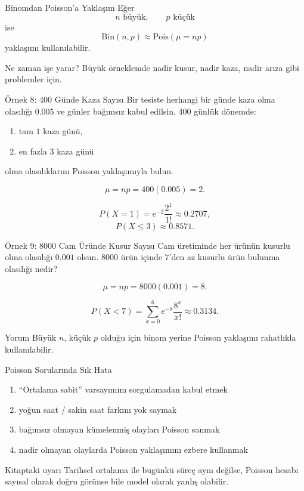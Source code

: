 \documentclass[light]{lutbeamer}
\begin{document}
\begin{frame}{Binomdan Poisson'a Yaklaşım}
    \small
    Eğer
    \[
    n \text{ büyük}, \qquad p \text{ küçük}
    \]
    ise
    \[
    \mathrm{Bin}(n,p)\approx \mathrm{Pois}(\mu=np)
    \]
    yaklaşımı kullanılabilir.

    \begin{block}{Ne zaman işe yarar?}
        Büyük örneklemde nadir kusur, nadir kaza, nadir arıza gibi problemler için.
    \end{block}
\end{frame}

\begin{frame}{Örnek 8: 400 Günde Kaza Sayısı}
    \small
    Bir tesiste herhangi bir günde kaza olma olasılığı \(0.005\) ve günler bağımsız kabul edilsin. \(400\) günlük dönemde:
    \begin{enumerate}
        \item[(a)] tam \(1\) kaza günü,
        \item[(b)] en fazla \(3\) kaza günü
    \end{enumerate}
    olma olasılıklarını Poisson yaklaşımıyla bulun.

    \[
    \mu=np=400(0.005)=2.
    \]

    \[
    P(X=1)=e^{-2}\frac{2^1}{1!}\approx 0.2707,
    \]
    \[
    P(X\le 3)\approx 0.8571.
    \]
\end{frame}

\begin{frame}{Örnek 9: 8000 Cam Üründe Kusur Sayısı}
    \small
    Cam üretiminde her ürünün kusurlu olma olasılığı \(0.001\) olsun. \(8000\) ürün içinde \(7\)'den az kusurlu ürün bulunma olasılığı nedir?

    \[
    \mu=np=8000(0.001)=8.
    \]

    \[
    P(X<7)=\sum_{x=0}^{6} e^{-8}\frac{8^x}{x!}\approx 0.3134.
    \]

    \begin{exampleblock}{Yorum}
        Büyük \(n\), küçük \(p\) olduğu için binom yerine Poisson yaklaşımı rahatlıkla kullanılabilir.
    \end{exampleblock}
\end{frame}

\begin{frame}{Poisson Sorularında Sık Hata}
    \small
    \begin{enumerate}
        \item ``Ortalama sabit'' varsayımını sorgulamadan kabul etmek
        \item yoğun saat / sakin saat farkını yok saymak
        \item bağımsız olmayan kümelenmiş olayları Poisson sanmak
        \item nadir olmayan olaylarda Poisson yaklaşımını ezbere kullanmak
    \end{enumerate}

    \begin{alertblock}{Kitaptaki uyarı}
        Tarihsel ortalama ile bugünkü süreç aynı değilse, Poisson hesabı sayısal olarak doğru görünse bile model olarak yanlış olabilir.
    \end{alertblock}
\end{frame}
\end{document}
